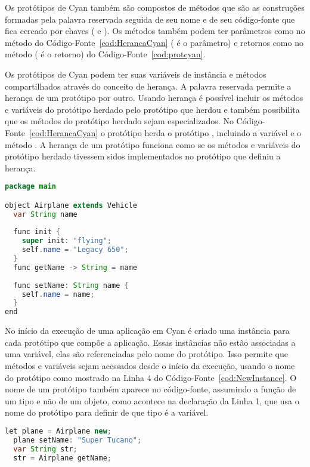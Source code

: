Os protótipos de Cyan também são compostos de métodos que são as construções formadas pela palavra reservada  seguida de seu nome e de seu código-fonte que fica cercado por chaves ( \srcstyle{\{} e \srcstyle{\}} ). Os métodos também podem ter parâmetros como no método  do  Código-Fonte~\ref{cod:HerancaCyan} ( é o parâmetro) e retornos como no método  ( é o retorno) do Código-Fonte~\ref{cod:protcyan}. 

Os protótipos de Cyan podem ter suas variáveis de instância e métodos compartilhados através do conceito de herança. A palavra reservada  permite a herança de um protótipo por outro. Usando herança é possível incluir os métodos e variáveis do protótipo herdado pelo protótipo que herdou e também possibilita que os métodos do protótipo herdado sejam especializados. No Código-Fonte~\ref{cod:HerancaCyan} o protótipo  herda o protótipo , incluindo a variável  e o método . A herança de um protótipo funciona como se os métodos e variáveis do protótipo herdado tivessem sidos implementados no protótipo que definiu a herança.

\begin{lstlisting}[language=Java, caption={Herança de Protótipo em Cyan}, label={cod:HerancaCyan}]
package main

object Airplane extends Vehicle
  var String name
  
  func init {
    super init: "flying";
    self.name = "Legacy 650"; 
  }
  func getName -> String = name
  
  func setName: String name {
    self.name = name;
  }
end
\end{lstlisting}

No início da execução de uma aplicação em Cyan é criado uma instância para cada protótipo que compõe a aplicação. Essas instâncias não estão associadas a uma variável, elas são referenciadas pelo nome do protótipo. Isso permite que métodos e variáveis sejam acessados desde o início da execução, usando o nome do protótipo como mostrado na Linha 4 do Código-Fonte~\ref{cod:NewInstance}. O nome de um protótipo também aparece no código-fonte, assumindo a função de um tipo e não de um objeto, como acontece na declaração da Linha 1, que usa o nome do protótipo para definir de que tipo é a variável.

\begin{lstlisting}[language=Java, caption={Nova instância de um protótipo}, label={cod:NewInstance}]
  let plane = Airplane new;
  plane setName: "Super Tucano";
  var String str;
  str = Airplane getName;
\end{lstlisting}

